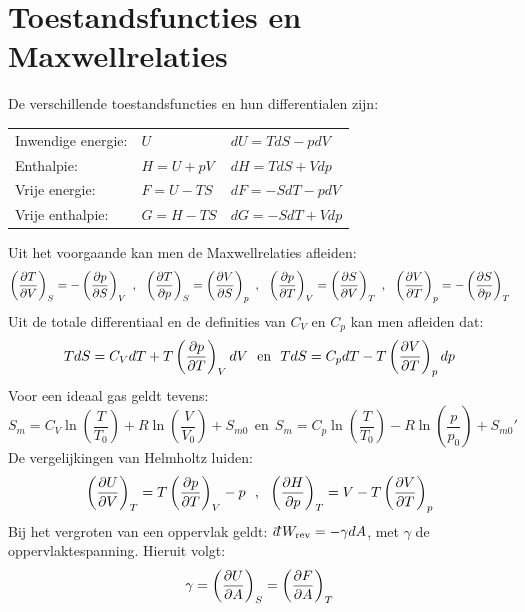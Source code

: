 \documentclass[twoside]{report}
\begin{document}
\section{Toestandsfuncties en Maxwellrelaties}
De verschillende toestandsfuncties en hun differentialen zijn:
\begin{center}
\begin{tabular}{||l@{~~~~~~~}l@{~~~~~~~}l||}
\hline
Inwendige energie:&$U$     &$dU=TdS-pdV$\\
Enthalpie:        &$H=U+pV$&$dH=TdS+Vdp$\\
Vrije energie:    &$F=U-TS$&$dF=-SdT-pdV$\\
Vrije enthalpie:  &$G=H-TS$&$dG=-SdT+Vdp$\\
\hline
\end{tabular}
\end{center}
Uit het voorgaande kan men de Maxwellrelaties afleiden:
\[
\left(\frac{\partial T}{\partial V}\right)_{S}=-\left(\frac{\partial p}{\partial S}\right)_{V}~,~~\left(\frac{\partial T}{\partial p}\right)_{S}=\left(\frac{\partial V}{\partial S}\right)_{p}~,~~
\left(\frac{\partial p}{\partial T}\right)_{V}=\left(\frac{\partial S}{\partial V}\right)_{T}~,~~\left(\frac{\partial V}{\partial T}\right)_{p}=-\left(\frac{\partial S}{\partial p}\right)_{T}
\]
Uit de totale differentiaal en de definities van $C_V$ en $C_p$ kan men
afleiden dat:
\[
TdS=C_VdT+T\left(\frac{\partial p}{\partial T}\right)_{V}dV~~\mbox{en}~~TdS=C_pdT-T\left(\frac{\partial V}{\partial T}\right)_{p}dp
\]
Voor een ideaal gas geldt tevens:
\[
S_m=C_V\ln\left(\frac{T}{T_0}\right)+R\ln\left(\frac{V}{V_0}\right)+S_{m0}~~\mbox{en}~~
S_m=C_p\ln\left(\frac{T}{T_0}\right)-R\ln\left(\frac{p}{p_0}\right)+S_{m0}'
\]
De vergelijkingen van Helmholtz luiden:
\[
\left(\frac{\partial U}{\partial V}\right)_{T}=T\left(\frac{\partial p}{\partial T}\right)_{V}-p~~,~~\left(\frac{\partial H}{\partial p}\right)_{T}=V-T\left(\frac{\partial V}{\partial T}\right)_{p}
\]
Bij het vergroten van een oppervlak geldt: $\dd W_{\rm rev}=-\gamma dA$, met
$\gamma$ de oppervlaktespanning. Hieruit volgt:
\[
\gamma=\left(\frac{\partial U}{\partial A}\right)_{S}=\left(\frac{\partial F}{\partial A}\right)_{T}
\]
\end{document}
